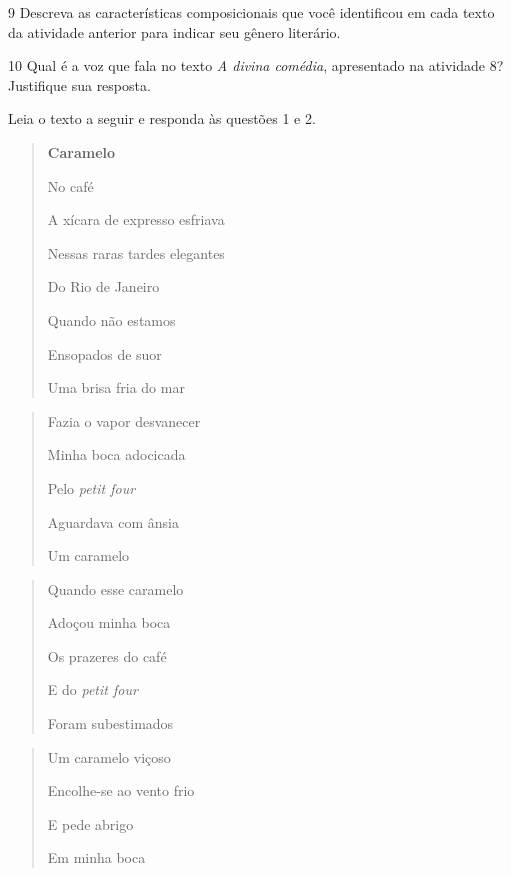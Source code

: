 \num{9} Descreva as características composicionais que você identificou
em cada texto da atividade anterior para indicar seu gênero literário.


\num{10} Qual é a voz que fala no texto \emph{A divina comédia},
apresentado na atividade 8? Justifique sua resposta.



Leia o texto a seguir e responda às questões 1 e 2.

\begin{quote}
\textbf{Caramelo}

No café

A xícara de expresso esfriava

Nessas raras tardes elegantes

Do Rio de Janeiro

Quando não estamos

Ensopados de suor

Uma brisa fria do mar
\end{quote}

\begin{quote}
Fazia o vapor desvanecer

Minha boca adocicada

Pelo \emph{petit four}

Aguardava com ânsia

Um caramelo
\end{quote}

\begin{quote}
Quando esse caramelo

Adoçou minha boca

Os prazeres do café

E do \emph{petit four}

Foram subestimados
\end{quote}

\begin{quote}
Um caramelo viçoso

Encolhe-se ao vento frio

E pede abrigo

Em minha boca
\end{quote}


